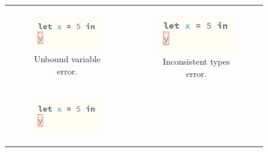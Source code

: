 \begin{figure}[htbp]
  \begin{tabular}[b]{cc}
    \begin{subfigure}[b]{0.3\columnwidth}
      \includegraphics[width=\columnwidth]{images/haz3l-unbound-variable.png}
      \caption{Unbound variable error.}
      \label{fig:calculus-examples-unbound}
    \end{subfigure}
    &
    \begin{subfigure}[b]{0.3\columnwidth}
      \includegraphics[width=\columnwidth]{images/haz3l-unbound-variable.png}
      \caption{Inconsistent types error.}
      \label{fig:calculus-examples-inconsistent-types}
    \end{subfigure} \\
    \begin{subfigure}[b]{0.3\columnwidth}
      \includegraphics[width=\columnwidth]{images/haz3l-unbound-variable.png}

\end{subfigure}
\end{tabular}
\end{figure}
